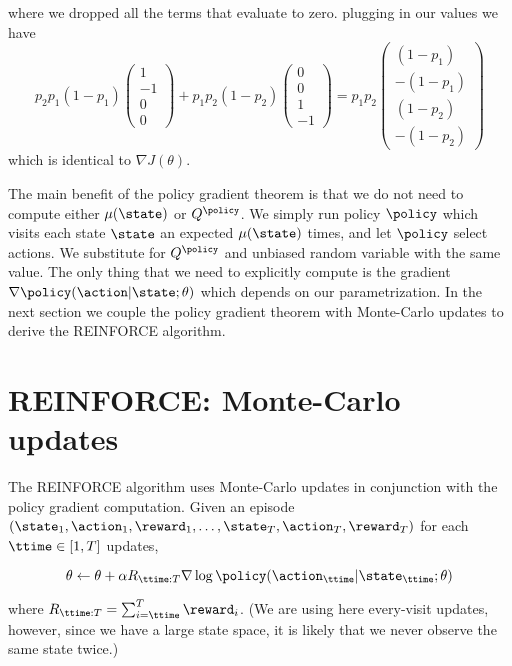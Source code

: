 \begin{example}
where we dropped all the terms that evaluate to zero. plugging in
our values we have
\[
p_2 p_1 (1-p_1)\begin{pmatrix}1\\-1\\0\\0\end{pmatrix} + p_1 p_2
(1-p_2)\begin{pmatrix}0\\0\\1\\-1\end{pmatrix} = p_1 p_2\begin{pmatrix}(1-p_1)\\
-(1-p_1) \\  (1-p_2) \\ - (1-p_2)\end{pmatrix}
\]
which is identical to $\nabla J(\theta)$.
\end{example}


The main benefit of the policy gradient theorem is that we do not
need to compute either $\mu(\state)$ or $Q^\policy$. We simply run
policy $\policy$ which visits each state $\state$ an expected
 $\mu(\state)$ times, and let $\policy$ select
actions. We substitute for $Q^\policy$ and unbiased random variable
with the same value. The only thing that we need to explicitly
compute is the gradient $\nabla \policy(\action|\state;\theta)$
which depends on our parametrization. In the next section we couple
the policy gradient theorem with Monte-Carlo updates to derive the
REINFORCE algorithm.


\section{REINFORCE: Monte-Carlo updates}

The REINFORCE algorithm uses Monte-Carlo updates in conjunction
with the policy gradient computation. Given an episode
$(\state_1,\action_1,\reward_1, \ldots ,
\state_T,\action_T,\reward_T)$ for each $\ttime\in [1,T]$ updates,

\[
\theta\leftarrow \theta+\alpha R_{\ttime:T} \nabla \log
\policy(\action_\ttime|\state_\ttime;\theta)
\]

where $R_{\ttime:T}=\sum_{i=\ttime}^T \reward_i$. (We are using here
every-visit updates, however, since we have a large state space, it
is likely that we never observe the same state twice.)


